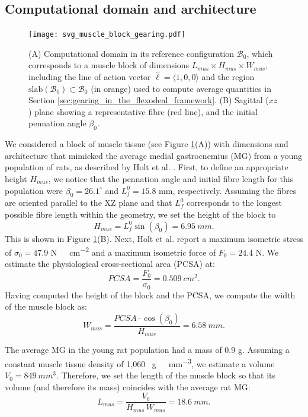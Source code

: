 \documentclass{sfuthesis}
\numberwithin{equation}{section}
\numberwithin{figure}{chapter}
\numberwithin{table}{chapter}
\theoremstyle{definition}
\newcommand{\B}{\mathcal{B}}
\begin{document}
\subsection{Computational domain and architecture}

\begin{figure}
    \centering
    \texttt{[image: svg\_muscle\_block\_gearing.pdf]}
    \caption{(A) Computational domain in its reference configuration $\B_0$, which corresponds to a muscle block of dimensions $L_{mus} \times H_{mus} \times W_{mus}$, including the line of action vector $\widehat{\bm{\ell}} = \langle 1,0,0 \rangle$ and the region $\mathrm{slab}(\B_0) \subset \B_0$ (in orange) used to compute average quantities in Section \ref{sec:gearing_in_the_flexodeal_framework}. (B) Sagittal ($xz$) plane showing a representative fibre (red line), and the initial pennation angle $\beta_0$.\label{fig:block_gearing}}
\end{figure}

We considered a block of muscle tissue (see Figure \ref{fig:block_gearing}(A)) with dimensions and architecture that mimicked the average medial gastrocnemius (MG) from a young population of rats, as described by Holt et al. \cite{Holt2016}. First, to define an appropriate height $H_{mus}$, we notice that the pennation angle and initial fibre length for this population were $\beta_0 = 26.1^\circ$ and $L_f^0 = 15.8$ mm, respectively. Assuming the fibres are oriented parallel to the XZ plane and that $L_f^0$ corresponds to the longest possible fibre length within the geometry, we set the height of the block to
\begin{equation}
    H_{mus} = L_f^0 \sin(\beta_0) = 6.95 \ \unit{mm}.
\end{equation}
This is shown in Figure \ref{fig:block_gearing}(B). Next, Holt et al. \cite{Holt2016} report a maximum isometric stress of $\sigma_0 = 47.9$ \unit{N \ cm^{-2}} and a maximum isometric force of $F_0 = 24.4$ N. We estimate the physiological cross-sectional area (PCSA) at:
\begin{equation}
    PCSA = \dfrac{F_0}{\sigma_0} = 0.509 \ \unit{cm^2}.
\end{equation}
Having computed the height of the block and the PCSA, we compute the width of the muscle block as:
\begin{equation}
    W_{mus} = \dfrac{PCSA \cdot \cos(\beta_0)}{H_{mus}} = 6.58 \ \unit{mm}.
\end{equation}

The average MG in the young rat population had a mass of 0.9 g. Assuming a constant muscle tissue density of 1,060 \unit{\mu g\ mm^{-3}}, we estimate a volume $V_0 = 849 \ \unit{mm^3}$. Therefore, we set the length of the muscle block so that its volume (and therefore its mass) coincides with the average rat MG:
\begin{equation}
    L_{mus} = \dfrac{V_0}{H_{mus} \, W_{mus}} = 18.6 \ \unit{mm}.
\end{equation}
\end{document}

